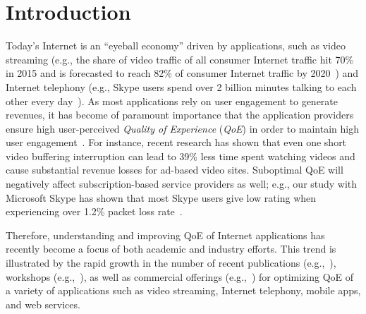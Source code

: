 \chapter{Introduction}


Today's Internet is an ``eyeball economy'' driven by applications, such 
as video streaming (e.g., the share of video traffic of all consumer Internet 
traffic  hit 70\% in 2015 and is forecasted to reach 82\% of consumer Internet traffic by 
2020~\cite{cisco-forecast-2015}) and Internet telephony (e.g., Skype users spend over 
2 billion minutes talking to each other every day~\cite{skype-2-billion-minutes}). 
As most applications rely on user engagement to generate revenues, 
it has become of paramount importance that the
application providers ensure high user-perceived 
{\em Quality of Experience} ({\em QoE}) in order to maintain high user 
engagement~\cite{sigcomm13athula,akamai-imc12}.
For instance, recent research has shown that even one short video buffering 
interruption can lead to 39\% less time spent watching videos and 
cause substantial  revenue losses for ad-based video sites. 
Suboptimal QoE will negatively affect subscription-based 
service providers as well; e.g., our study with Microsoft Skype 
has shown that most Skype  users give low rating when experiencing over
1.2\% packet loss rate~\cite{via}.

Therefore, understanding and improving QoE of Internet applications 
has recently become a focus of both academic and industry efforts. 
This trend is illustrated by the rapid growth in the number of recent
publications (e.g.,~\cite{sigcomm13athula,sigcomm12,
wang2014speedy,sigcomm11,eona,akamai-imc12}), workshops 
(e.g.,~\cite{workshop-wmust,workshop-fhmn,workshop-qoe}), 
as well as commercial offerings (e.g.,~\cite{conviva,artizanetworks}) for optimizing QoE 
of a variety of applications such as video streaming, Internet telephony, mobile 
apps, and web services.



